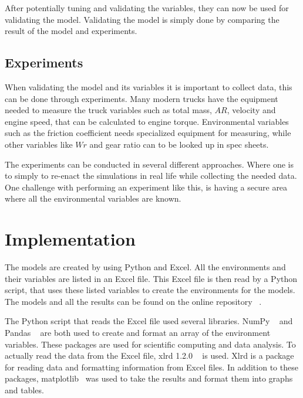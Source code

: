 \documentclass[noprint]{uit-thesis}
\begin{document}
After potentially tuning and validating the variables, they can now be used for validating the model. Validating the model is simply done by comparing the result of the model and experiments.

\subsection{Experiments}
When validating the model and its variables it is important to collect data, this can be done through experiments. Many modern trucks have the equipment needed to measure the truck variables such as total mass, $AR$, velocity and engine speed, that can be calculated to engine torque. Environmental variables such as the friction coefficient needs specialized equipment for measuring, while other variables like $Wr$ and gear ratio can to be looked up in spec sheets. 
\par
The experiments can be conducted in several different approaches. Where one is to simply to re-enact the simulations in real life while collecting the needed data. One challenge with performing an experiment like this, is having a secure area where all the environmental variables are known.


\section{Implementation}
\label{implementation}
The models are created by using Python and Excel. All the environments and their variables are listed in an Excel file. This Excel file is then read by a Python script, that uses these listed variables to create the environments for the models. The models and all the results can be found on the online repository ~\citep{repo}.
\par
The Python script that reads the Excel file used several libraries. NumPy ~\citep{numpy} and Pandas ~\citep{pandas} are both used to create and format an array of the environment variables. These packages are used for scientific computing and data analysis. To actually read the data from the Excel file, xlrd 1.2.0 ~\citep{xlrd} is used. Xlrd is a package for reading data and formatting information from Excel files. In addition to these packages, matplotlib~\citep{plt} was used to take the results and format them into graphs and tables. 
\end{document}
